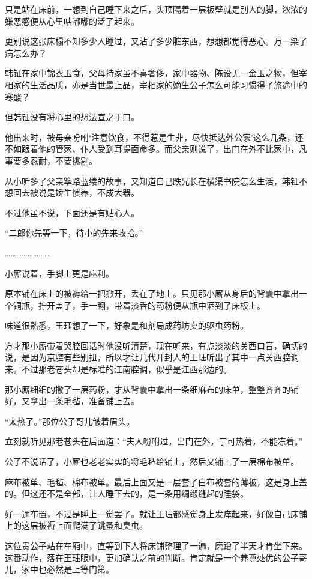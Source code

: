只是站在床前，一想到自己睡下来之后，头顶隔着一层板壁就是别人的脚，浓浓的嫌恶感便从心里咕嘟嘟的泛了起来。

更别说这张床榻不知多少人睡过，又沾了多少脏东西，想想都觉得恶心。万一染了病怎么办？

韩钲在家中锦衣玉食，父母持家虽不喜奢侈，家中器物、陈设无一金玉之物，但宰相家的生活品质，亦是当世最上品，宰相家的嫡生公子怎么可能习惯得了旅途中的寒酸？

但韩钲没有将心里的想法宣之于口。

他出来时，被母亲吩咐‘注意饮食，不得惹是生非，尽快抵达外公家’这么几条，还不如跟着他的管家、仆人受到耳提面命多。而父亲则说了，出门在外不比家中，凡事要多忍耐，不要挑剔。

从小听多了父亲筚路蓝缕的故事，又知道自己跌兄长在横渠书院怎么生活，韩钲不想回去被说是娇生惯养，不成大器。

不过他虽不说，下面还是有贴心人。

“二郎你先等一下，待小的先来收拾。”

……………………

小厮说着，手脚上更是麻利。

原本铺在床上的被褥给一把掀开，丢在了地上。只见那小厮从身后的背囊中拿出一个铜瓶，拧开盖子，手一翻，带着淡香的药粉便从瓶中洒到了床板上。

味道很熟悉，王珏想了一下，好象是和剂局成药坊卖的驱虫药粉。

方才那小厮带着哭腔回话时他没听清楚，现在听来，有点淡淡的关西口音，确切的说，是因为京腔有些别扭，所以才让几代开封人的王珏听出了其中一点关西腔调来。不过那老苍头却是标准的江南腔调，似乎是江西那边的。

那小厮细细的撒了一层药粉，才从背囊中拿出一条细麻布的床单，整整齐齐的铺好，又拿出一条毛毡，准备铺上去。

“太热了。”那位公子哥儿皱着眉头。

立刻就听见那老苍头在后面道：“夫人吩咐过，出门在外，宁可热着，不能冻着。”

公子不说话了，小厮也老老实实的将毛毡给铺上，然后又铺上了一层棉布被单。

麻布被单、毛毡、棉布被单。最后上面又是一层套了白布被套的薄被，这是身上盖的。但这还不是全部，让人睡下去的，是一条用绸缎缝起的睡袋。

好一通布置，不过是睡上一觉罢了。就让王珏都感觉身上发痒起来，好像自己床铺上的这层被褥上面爬满了跳蚤和臭虫。

这位贵公子站在车厢中，直等到下人将床铺整理了一遍，磨蹭了半天才肯坐下来。这番动作，落在王珏眼中，更加确认之前的判断。肯定就是一个养尊处优的公子哥儿，家中也必然是上等门第。

